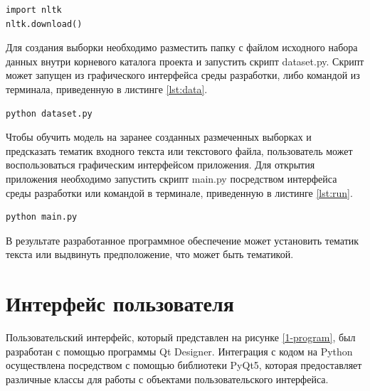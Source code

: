 \begin{lstlisting}[caption=Установка словарей nltk, label=lst:nltk]
import nltk
nltk.download()
\end{lstlisting}

Для создания выборки необходимо разместить папку с файлом исходного набора данных внутри корневого каталога проекта и запустить скрипт dataset.py. Скрипт может запущен из графического интерфейса среды разработки, либо командой из терминала, приведенную в листинге \ref{lst:data}.

\begin{lstlisting}[caption= Команда для создания обучающих выборок, label=lst:data]
python dataset.py
\end{lstlisting}

Чтобы обучить модель на заранее созданных размеченных выборках и предсказать тематик входного текста или текстового файла, пользователь может воспользоваться графическим интерфейсом приложения. Для открытия приложения необходимо запустить скрипт main.py посредством интерфейса среды разработки или командой в терминале, приведенную в листинге \ref{lst:run}.

\begin{lstlisting}[caption=Команда для запуска приложения, label=lst:run]
python main.py
\end{lstlisting}

В результате разработанное программное обеспечение может установить тематик текста или выдвинуть предположение, что может быть тематикой.

\section{Интерфейс пользователя}
Пользовательский интерфейс, который представлен на рисунке \ref{1-program}, был разработан с помощью программы Qt Designer. Интеграция с кодом на Python осуществлена посредством с помощью библиотеки PyQt5, которая предоставляет различные классы для работы с объектами пользовательского интерфейса.

